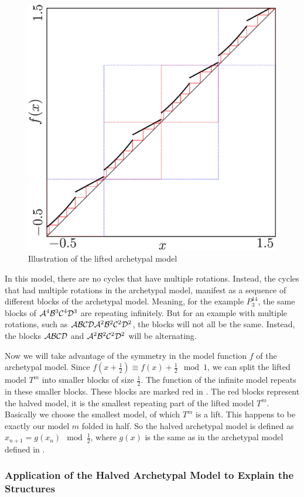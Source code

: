 \begin{figure}
	\centering
	\includegraphics[width=.7 \textwidth]{../Figures/7/7.18/result.png}
	\caption{Illustration of the lifted archetypal model}
	\label{fig:add.halved.lift}
\end{figure}

In this model, there are no cycles that have multiple rotations.
Instead, the cycles that had multiple rotations in the archetypal model, manifest as a sequence of different blocks of the archetypal model.
Meaning, for the example $P^{14}_3$, the same blocks of $\mathcal{A}^4\mathcal{B}^3\mathcal{C}^4\mathcal{D}^3$ are repeating infinitely.
But for an example with multiple rotations, such as $\mathcal{A}\mathcal{B}\mathcal{C}\mathcal{D}\mathcal{A}^2\mathcal{B}^2\mathcal{C}^2\mathcal{D}^2$, the blocks will not all be the same.
Instead, the blocks $\mathcal{A}\mathcal{B}\mathcal{C}\mathcal{D}$ and $\mathcal{A}^2\mathcal{B}^2\mathcal{C}^2\mathcal{D}^2$ will be alternating.

Now we will take advantage of the symmetry in the model function $f$ of the archetypal model.
Since $f\left(x + \frac{1}{2}\right) \equiv f(x) + \frac{1}{2} \mod 1$, we can split the lifted model $T^m$ into smaller blocks of size $\frac{1}{2}$.
The function of the infinite model repeats in these smaller blocks.
These blocks are marked red in .
The red blocks represent the halved model, it is the smallest repeating part of the lifted model $T^m$.
Basically we choose the smallest model, of which $T^m$ is a lift.
This happens to be exactly our model $m$ folded in half.
So the halved archetypal model is defined as $x_{n+1} = g(x_n) \mod \frac{1}{2}$, where $g(x)$ is the same as in the archetypal model defined in .

\subsubsection{Application of the Halved Archetypal Model to Explain the  Structures}

